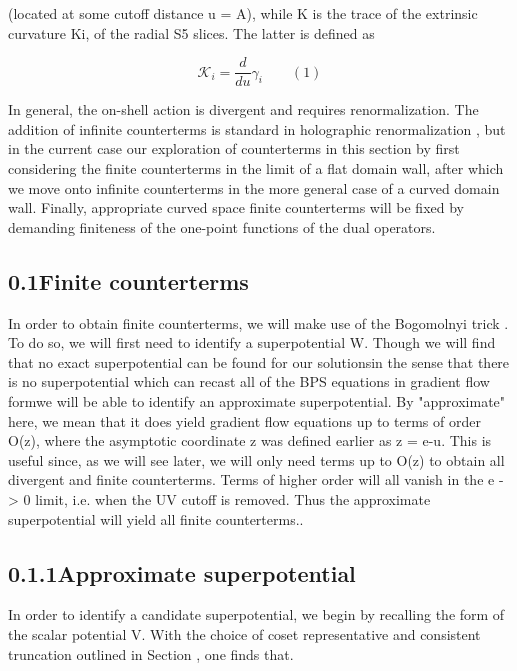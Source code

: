 \documentclass{article}
\begin{document}
\sloppy

(located at some cutoff distance u = A), while K is the trace of the extrinsic curvature
Ki, of the radial S5 slices. The latter is defined as


\begin{equation}
\mathcal { K } _ { i } = \frac { d } { d u } \gamma _ { i } \qquad ( 1 )
\end{equation}


In general, the on-shell action is divergent and requires renormalization. The addition of
infinite counterterms is standard in holographic renormalization , but in the current case
our exploration of counterterms in this section by first considering the finite counterterms in
the limit of a flat domain wall, after which we move onto infinite counterterms in the more
general case of a curved domain wall. Finally, appropriate curved space finite counterterms
will be fixed by demanding finiteness of the one-point functions of the dual operators.


\subsection*{0.1Finite counterterms}


In order to obtain finite counterterms, we will make use of the Bogomolnyi trick . To do
so, we will first need to identify a superpotential W. Though we will find that no exact
superpotential can be found for our solutionsin the sense that there is no superpotential
which can recast all of the BPS equations in gradient flow formwe will be able to identify
an approximate superpotential. By "approximate" here, we mean that it does yield gradient
flow equations up to terms of order O(z), where the asymptotic coordinate z was defined
earlier as z = e-u. This is useful since, as we will see later, we will only need terms up to
O(z) to obtain all divergent and finite counterterms. Terms of higher order will all vanish
in the e -> 0 limit, i.e. when the UV cutoff is removed. Thus the approximate superpotential
will yield all finite counterterms..


\subsection*{0.1.1Approximate superpotential}


In order to identify a candidate superpotential, we begin by recalling the form of the scalar
potential V. With the choice of coset representative and consistent truncation outlined in
Section , one finds that.
\end{document}
